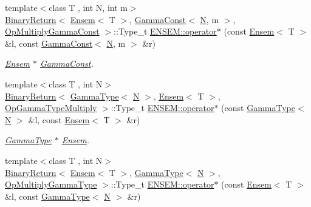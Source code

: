 \begin{DoxyCompactItemize}
{\footnotesize template$<$class T , int N, int m$>$ }\\\mbox{\hyperlink{structENSEM_1_1BinaryReturn}{Binary\+Return}}$<$ \mbox{\hyperlink{classENSEM_1_1Ensem}{Ensem}}$<$ T $>$, \mbox{\hyperlink{classENSEM_1_1GammaConst}{Gamma\+Const}}$<$ \mbox{\hyperlink{adat__devel_2lib_2hadron_2operator__name__util_8cc_a7722c8ecbb62d99aee7ce68b1752f337}{N}}, m $>$, \mbox{\hyperlink{structENSEM_1_1OpMultiplyGammaConst}{Op\+Multiply\+Gamma\+Const}} $>$\+::Type\+\_\+t \mbox{\hyperlink{group__eensem_gaada3f84ca5744bafe60557482cc90c26}{E\+N\+S\+E\+M\+::operator$\ast$}} (const \mbox{\hyperlink{classENSEM_1_1Ensem}{Ensem}}$<$ T $>$ \&l, const \mbox{\hyperlink{classENSEM_1_1GammaConst}{Gamma\+Const}}$<$ \mbox{\hyperlink{adat__devel_2lib_2hadron_2operator__name__util_8cc_a7722c8ecbb62d99aee7ce68b1752f337}{N}}, m $>$ \&r)
\begin{DoxyCompactList}\small\item\em \mbox{\hyperlink{classENSEM_1_1Ensem}{Ensem}} $\ast$ \mbox{\hyperlink{classENSEM_1_1GammaConst}{Gamma\+Const}}. \end{DoxyCompactList}\item 
{\footnotesize template$<$class T , int N$>$ }\\\mbox{\hyperlink{structENSEM_1_1BinaryReturn}{Binary\+Return}}$<$ \mbox{\hyperlink{classENSEM_1_1GammaType}{Gamma\+Type}}$<$ \mbox{\hyperlink{adat__devel_2lib_2hadron_2operator__name__util_8cc_a7722c8ecbb62d99aee7ce68b1752f337}{N}} $>$, \mbox{\hyperlink{classENSEM_1_1Ensem}{Ensem}}$<$ T $>$, \mbox{\hyperlink{structENSEM_1_1OpGammaTypeMultiply}{Op\+Gamma\+Type\+Multiply}} $>$\+::Type\+\_\+t \mbox{\hyperlink{group__eensem_ga399b896691f2d528edcade561c6e571d}{E\+N\+S\+E\+M\+::operator$\ast$}} (const \mbox{\hyperlink{classENSEM_1_1GammaType}{Gamma\+Type}}$<$ \mbox{\hyperlink{adat__devel_2lib_2hadron_2operator__name__util_8cc_a7722c8ecbb62d99aee7ce68b1752f337}{N}} $>$ \&l, const \mbox{\hyperlink{classENSEM_1_1Ensem}{Ensem}}$<$ T $>$ \&r)
\begin{DoxyCompactList}\small\item\em \mbox{\hyperlink{classENSEM_1_1GammaType}{Gamma\+Type}} $\ast$ \mbox{\hyperlink{classENSEM_1_1Ensem}{Ensem}}. \end{DoxyCompactList}\item 
{\footnotesize template$<$class T , int N$>$ }\\\mbox{\hyperlink{structENSEM_1_1BinaryReturn}{Binary\+Return}}$<$ \mbox{\hyperlink{classENSEM_1_1Ensem}{Ensem}}$<$ T $>$, \mbox{\hyperlink{classENSEM_1_1GammaType}{Gamma\+Type}}$<$ \mbox{\hyperlink{adat__devel_2lib_2hadron_2operator__name__util_8cc_a7722c8ecbb62d99aee7ce68b1752f337}{N}} $>$, \mbox{\hyperlink{structENSEM_1_1OpMultiplyGammaType}{Op\+Multiply\+Gamma\+Type}} $>$\+::Type\+\_\+t \mbox{\hyperlink{group__eensem_ga5a4ddba3b396c11e474246b57940a2cc}{E\+N\+S\+E\+M\+::operator$\ast$}} (const \mbox{\hyperlink{classENSEM_1_1Ensem}{Ensem}}$<$ T $>$ \&l, const \mbox{\hyperlink{classENSEM_1_1GammaType}{Gamma\+Type}}$<$ \mbox{\hyperlink{adat__devel_2lib_2hadron_2operator__name__util_8cc_a7722c8ecbb62d99aee7ce68b1752f337}{N}} $>$ \&r)

\end{DoxyCompactItemize}

